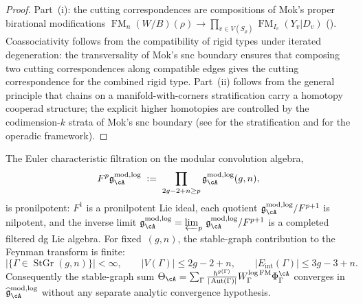 \begin{proof}
Part~(i): the cutting correspondences are compositions of Mok's
proper birational modifications
$\operatorname{FM}_n(W/B)(\rho) \to
\prod_{v \in V(S_\rho)} \operatorname{FM}_{I_v}(Y_v | D_v)$
(\cite[Corollary~5.3.4]{Mok25}).
Coassociativity follows from the compatibility of rigid types under
iterated degeneration: the transversality of Mok's snc boundary
ensures that composing two cutting correspondences along compatible
edges gives the cutting correspondence for the combined rigid type.
Part~(ii) follows from the general principle that chains on a
manifold-with-corners stratification carry a homotopy cooperad
structure; the explicit higher homotopies are controlled by the
codimension-$k$ strata of Mok's snc boundary
(see \cite[Section~5]{Mok25} for the stratification and
\cite[Theorem~11.1.2]{LV12} for the operadic framework).
\end{proof}

\begin{theorem}
\label{thm:stable-graph-pronilpotent-completion}
The Euler characteristic filtration on the modular convolution algebra,
\begin{equation}
\label{eq:pronilpotent-filtration}
F^p \mathfrak{g}^{\mathrm{mod,log}}_\cA
\;:=\;
\prod_{2g - 2 + n \geq p}
\mathfrak{g}^{\mathrm{mod,log}}_\cA(g,n),
\end{equation}
is pronilpotent: $F^1$ is a pronilpotent Lie ideal, each quotient
$\mathfrak{g}^{\mathrm{mod,log}}_\cA / F^{p+1}$ is nilpotent,
and the inverse limit
$\mathfrak{g}^{\mathrm{mod,log}}_\cA =
\varprojlim_p\, \mathfrak{g}^{\mathrm{mod,log}}_\cA / F^{p+1}$
is a completed filtered dg Lie algebra.  For fixed~$(g,n)$, the
stable-graph contribution to the Feynman transform is finite:
\begin{equation}
\label{eq:graph-finiteness}
|\{\Gamma \in \operatorname{StGr}(g,n)\}| < \infty,
\qquad
|V(\Gamma)| \leq 2g - 2 + n,
\qquad
|E_{\mathrm{int}}(\Gamma)| \leq 3g - 3 + n.
\end{equation}
Consequently the stable-graph sum
$\Theta_\cA = \sum_\Gamma
\frac{\hbar^{g(\Gamma)}}{|\operatorname{Aut}(\Gamma)|}
W_\Gamma^{\log\mathrm{FM}} \Phi_\Gamma^\cA$
converges in $\widehat{\mathfrak{g}}^{\mathrm{mod,log}}_\cA$ without
any separate analytic convergence hypothesis.
\end{theorem}

